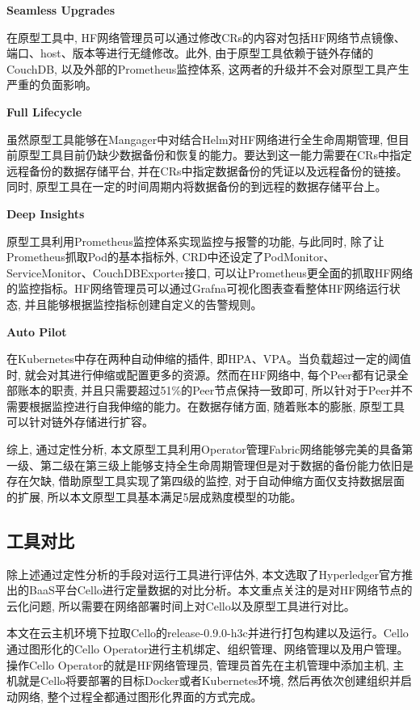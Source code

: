 \textbf{Seamless Upgrades}

在原型工具中, HF网络管理员可以通过修改CRs的内容对包括HF网络节点镜像、端口、host、版本等进行无缝修改。此外, 由于原型工具依赖于链外存储的CouchDB, 以及外部的Prometheus监控体系, 这两者的升级并不会对原型工具产生严重的负面影响。 

\textbf{Full Lifecycle}

虽然原型工具能够在Mangager中对结合Helm对HF网络进行全生命周期管理, 但目前原型工具目前仍缺少数据备份和恢复的能力。要达到这一能力需要在CRs中指定远程备份的数据存储平台, 并在CRs中指定数据备份的凭证以及远程备份的链接。同时, 原型工具在一定的时间周期内将数据备份的到远程的数据存储平台上。

\textbf{Deep Insights}

原型工具利用Prometheus监控体系实现监控与报警的功能, 与此同时, 除了让Prometheus抓取Pod的基本指标外, CRD中还设定了PodMonitor、ServiceMonitor、CouchDBExporter接口, 可以让Prometheus更全面的抓取HF网络的监控指标。HF网络管理员可以通过Grafna可视化图表查看整体HF网络运行状态, 并且能够根据监控指标创建自定义的告警规则。

\textbf{Auto Pilot}

在Kubernetes中存在两种自动伸缩的插件, 即HPA、VPA。当负载超过一定的阈值时, 就会对其进行伸缩或配置更多的资源。然而在HF网络中, 每个Peer都有记录全部账本的职责, 并且只需要超过51\%的Peer节点保持一致即可, 所以针对于Peer并不需要根据监控进行自我伸缩的能力。在数据存储方面, 随着账本的膨胀, 原型工具可以针对链外存储进行扩容。

综上, 通过定性分析, 本文原型工具利用Operator管理Fabric网络能够完美的具备第一级、第二级在第三级上能够支持全生命周期管理但是对于数据的备份能力依旧是存在欠缺, 借助原型工具实现了第四级的监控, 对于自动伸缩方面仅支持数据层面的扩展, 所以本文原型工具基本满足5层成熟度模型的功能。

\subsection{工具对比} \label{section: tool_comparison}

除上述通过定性分析的手段对运行工具进行评估外, 本文选取了Hyperledger官方推出的BaaS平台Cello进行定量数据的对比分析。本文重点关注的是对HF网络节点的云化问题, 所以需要在网络部署时间上对Cello以及原型工具进行对比。

本文在云主机环境下拉取Cello的release-0.9.0-h3c并进行打包构建以及运行。Cello通过图形化的Cello Operator进行主机绑定、组织管理、网络管理以及用户管理。操作Cello Operator的就是HF网络管理员, 管理员首先在主机管理中添加主机, 主机就是Cello将要部署的目标Docker或者Kubernetes环境, 然后再依次创建组织并启动网络, 整个过程全都通过图形化界面的方式完成。

